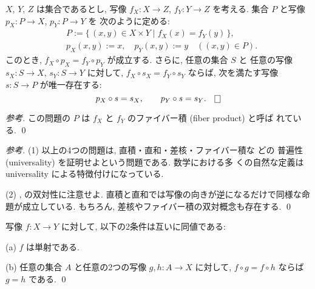 \documentclass[12pt,twoside]{jarticle}
\begin{document}


\begin{question}[10点]
$X$, $Y$, $Z$ は集合であるとし, 
写像 $f_X\colon X\to Z$, $f_Y\colon Y\to Z$ を考える. 
集合 $P$ と写像 $p_X\colon P\to X$, $p_Y\colon P\to Y$ を
次のように定める:
\begin{align*}
  & P := \{\,(x,y)\in X\times Y \mid f_X(x)=f_Y(y)\,\}, \\
  & p_X(x,y) := x, \quad p_Y(x,y) := y \quad ((x,y)\in P).
\end{align*}
このとき, $f_X\circ p_X = f_Y\circ p_Y$ が成立する. 
さらに, 任意の集合 $S$ と
任意の写像 $s_X\colon S\to X$, $s_Y\colon S\to Y$ に対して, 
$f_X\circ s_X = f_Y\circ s_Y$ ならば, 
次を満たす写像 $s\colon S\to P$ が唯一存在する:
\[
  p_X\circ s = s_X, \qquad p_Y\circ s = s_Y.
  \qed
\]
\end{question}

\begin{proof}[参考]
この問題の $P$ は $f_X$ と $f_Y$ のファイバー積 (fiber product) と呼ば
れている.
\qed
\end{proof}

\begin{proof}[参考]
(1) 以上の4つの問題は, 直積・直和・差核・ファイバー積な
どの 普遍性 (universality) を証明せよという問題である. 数学における多
くの自然な定義は universality による特徴付けになっている.

\par\noindent
(2) ,  の双対性に注意せよ. 
直積と直和では写像の向きが逆になるだけで同様な命題が成立している. 
もちろん, 差核やファイバー積の双対概念も存在する.
\qed
\end{proof}


\begin{question}[10点]
写像 $f \colon X \to Y$ に対して, 以下の2条件は互いに同値である:
\par\medskip\noindent
(a) $f$ は単射である.
\par\medskip\noindent
(b) 任意の集合 $A$ と任意の2つの写像 $g,h \colon A \to X$ に対して,
$f \circ g = f \circ h$ ならば $g = h$ である.
\qed
\end{question}

\end{document}
